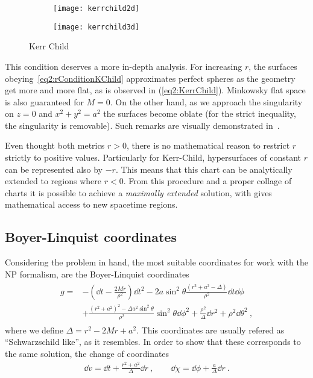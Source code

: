 \begin{figure}[h]
    \centering
    \begin{subfigure}[c]{0.45\textwidth}
        \texttt{[image: kerrchild2d]}
    \end{subfigure}
    \hspace{1cm}
    \begin{subfigure}[c]{0.35\textwidth}
        \texttt{[image: kerrchild3d]}
    \end{subfigure}
    \caption{Kerr Child}\label{fig2:kerrchild}
\end{figure}

This condition deserves a more in-depth analysis.
For increasing $r$, the surfaces obeying~\eqref{eq2:rConditionKChild} approximates perfect spheres as the geometry get more and more flat, as is observed in (\ref{eq2:KerrChild}).
Minkowsky flat space is also guaranteed for $M=0$.
On the other hand, as we approach the singularity on $z=0$ and $x^2+y^2 = a^2$ the surfaces become oblate (for the strict inequality, the singularity is removable).
Such remarks are visually demonstrated in~.

Even thought both metrics $r>0$, there is no mathematical reason to restrict $r$ strictly to positive values.
Particularly for Kerr-Child, hypersurfaces of constant $r$ can be represented also by $-r$. 
This means that this chart can be analytically extended to regions where $r<0$.
From this procedure and a proper collage of charts it is possible to achieve a \emph{maximally extended} solution, with gives mathematical access to new spacetime regions.


\subsection{Boyer-Linquist coordinates}

Considering the problem in hand, the most suitable coordinates for work with the NP formalism, are the Boyer-Linquist coordinates
\begin{align}
    \begin{split}
        g = &- \left(\dd t - \frac{2 M r}{\rho^2} \right) \dd t^2 - 2 a \sin^2\theta \frac{(r^2+a^2-\Delta)}{\rho^2} \dd t \dd \phi \\
        &+ \frac{(r^2+a^2)^2- \Delta a^2 \sin^2\theta}{\rho^2} \sin^2\theta \dd\phi^2 + \frac{\rho^2}{\Delta} \dd r^2 + \rho^2 \dd \theta^2 ~,
    \end{split}
    \label{eq2:KerrIngoingEF}
\end{align}
where we define $\Delta=r^2-2 M r + a^2$. This coordinates are usually refered as ``Schwarzschild like'', as it resembles. In order to show that these corresponds to the same solution, the change of coordinates
\begin{align}
    \dd v= \dd t + \frac{r^2+a^2}{\Delta} \dd r ~, \qquad \dd\chi = \dd\phi + \frac{a}{\Delta} \dd r ~.
    \label{eq2:InEFtoBL}
\end{align}





